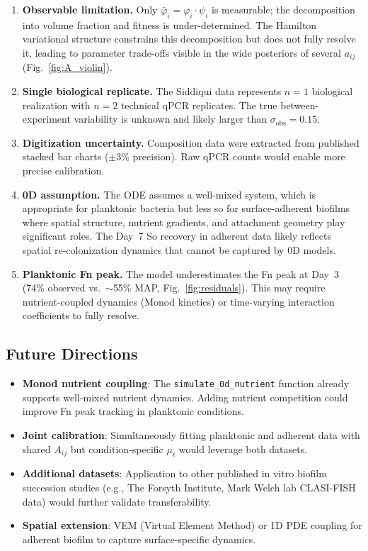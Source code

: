 \documentclass[11pt,a4paper]{article}
\begin{document}
\begin{enumerate}
\item \textbf{Observable limitation.} Only $\bar{\varphi}_i = \varphi_i \cdot \psi_i$
is measurable; the decomposition into volume fraction and fitness is
under-determined. The Hamilton variational structure constrains this decomposition
but does not fully resolve it, leading to parameter trade-offs visible in
the wide posteriors of several $a_{ij}$ (Fig.~\ref{fig:A_violin}).

\item \textbf{Single biological replicate.} The Siddiqui data represents $n=1$
biological realization with $n=2$ technical qPCR replicates. The true
between-experiment variability is unknown and likely larger than
$\sigma_\mathrm{obs} = 0.15$.

\item \textbf{Digitization uncertainty.} Composition data were extracted from
published stacked bar charts ($\pm 3$\% precision). Raw qPCR counts would
enable more precise calibration.

\item \textbf{0D assumption.} The ODE assumes a well-mixed system, which is
appropriate for planktonic bacteria but less so for surface-adherent biofilms
where spatial structure, nutrient gradients, and attachment geometry play
significant roles. The Day~7 So recovery in adherent data likely reflects
spatial re-colonization dynamics that cannot be captured by 0D models.

\item \textbf{Planktonic Fn peak.} The model underestimates the Fn peak at Day~3
(74\% observed vs.\ $\sim$55\% MAP, Fig.~\ref{fig:residuals}).
This may require nutrient-coupled dynamics
(Monod kinetics) or time-varying interaction coefficients to fully resolve.
\end{enumerate}

\subsection{Future Directions}

\begin{itemize}
\item \textbf{Monod nutrient coupling}: The \texttt{simulate\_0d\_nutrient} function
already supports well-mixed nutrient dynamics. Adding nutrient competition
could improve Fn peak tracking in planktonic conditions.
\item \textbf{Joint calibration}: Simultaneously fitting planktonic and adherent data
with shared $A_{ij}$ but condition-specific $\mu_i$ would leverage both datasets.
\item \textbf{Additional datasets}: Application to other published in vitro biofilm
succession studies (e.g., The Forsyth Institute, Mark Welch lab CLASI-FISH data)
would further validate transferability.
\item \textbf{Spatial extension}: VEM (Virtual Element Method) or 1D PDE coupling
for adherent biofilm to capture surface-specific dynamics.
\end{itemize}
\end{document}
